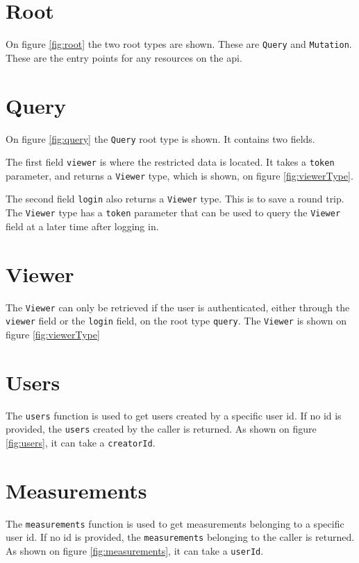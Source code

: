 \section{Root}
\label{sec:root}
On figure \ref{fig:root} the two root types are shown. 
These are \verb+Query+ and \verb+Mutation+.
These are the entry points for any resources on the \gls{api}.


\section{Query}
\label{sec:query}
On figure \ref{fig:query} the \verb+Query+ root type is shown. It contains two fields. 

The first field \verb+viewer+ is where the restricted data is located.
It takes a \verb+token+ parameter, and returns a \verb+Viewer+ type, which is shown, on figure \ref{fig:viewerType}.

The second field \verb+login+ also returns a \verb+Viewer+ type. 
This is to save a round trip.
The \verb+Viewer+ type has a \verb+token+ parameter that can be used to query the \verb+Viewer+ field at a later time after logging in.

\section{Viewer}
\label{sec:viewer}
The \verb+Viewer+ can only be retrieved if the user is authenticated, either through the \verb+viewer+ field or the \verb+login+ field, on the root type \verb+query+. The \verb+Viewer+ is shown on figure \ref{fig:viewerType}

\section{Users}
The \verb+users+ function is used to get users created by a specific user id. If no id is provided, the \verb+users+ created by the caller is returned. 
As shown on figure \ref{fig:users}, it can take a \verb+creatorId+.

\section{Measurements}
The \verb+measurements+ function is used to get measurements belonging to a specific user id. If no id is provided, the \verb+measurements+ belonging to the caller is returned. 
As shown on figure \ref{fig:measurements}, it can take a \verb+userId+.


